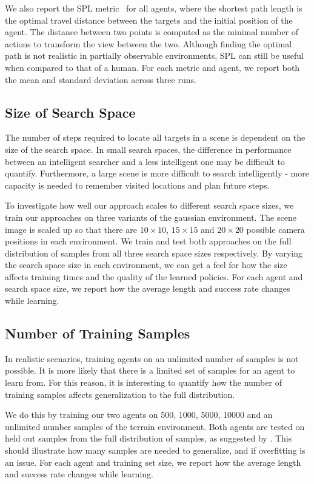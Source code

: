 We also report the SPL metric~\cite{anderson_evaluation_2018} for all agents, where the shortest path length is the optimal travel distance between the targets and the initial position of the agent.
The distance between two points is computed as the minimal number of actions to transform the view between the two.
Although finding the optimal path is not realistic in partially observable environments, SPL can still be useful when compared to that of a human.
For each metric and agent, we report both the mean and standard deviation across three runs.

\subsection{Size of Search Space}

The number of steps required to locate all targets in a scene is dependent on the size of the search space.
In small search spaces, the difference in performance between an intelligent searcher and a less intelligent one may be difficult to quantify.
Furthermore, a large scene is more difficult to search intelligently - more capacity is needed to remember visited locations and plan future steps.

To investigate how well our approach scales to different search space sizes, we train our approaches on three variants of the gaussian environment.
The scene image is scaled up so that there are \(10 \times 10\), \(15 \times 15\) and \(20 \times 20\) possible camera positions in each environment.
We train and test both approaches on the full distribution of samples from all three search space sizes respectively.
By varying the search space size in each environment, we can get a feel for how the size affects training times and the quality of the learned policies.
For each agent and search space size, we report how the average length and success rate changes while learning.

\subsection{Number of Training Samples}

In realistic scenarios, training agents on an unlimited number of samples is not possible.
It is more likely that there is a limited set of samples for an agent to learn from.
For this reason, it is interesting to quantify how the number of training samples affects generalization to the full distribution.

We do this by training our two agents on 500, 1000, 5000, 10000 and an unlimited number samples of the terrain environment.
Both agents are tested on held out samples from the full distribution of samples, as suggested by \cite{cobbe_procgen_2020}.
This should illustrate how many samples are needed to generalize, and if overfitting is an issue.
For each agent and training set size, we report how the average length and success rate changes while learning.


